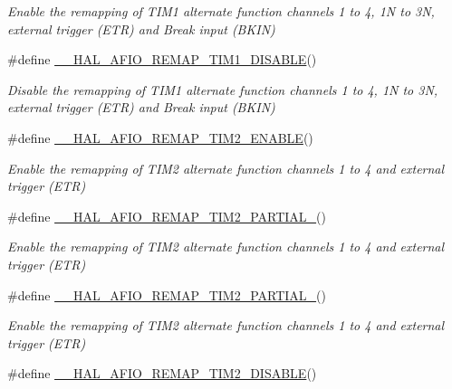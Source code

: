 \begin{DoxyCompactItemize}
\begin{DoxyCompactList}\small\item\em Enable the remapping of T\+I\+M1 alternate function channels 1 to 4, 1N to 3N, external trigger (E\+TR) and Break input (B\+K\+IN) \end{DoxyCompactList}\item 
\#define \hyperlink{group___g_p_i_o_ex___a_f_i_o___a_f___r_e_m_a_p_p_i_n_g_ga0d5d38cb3fbb600d76fdd4625e3d700c}{\+\_\+\+\_\+\+H\+A\+L\+\_\+\+A\+F\+I\+O\+\_\+\+R\+E\+M\+A\+P\+\_\+\+T\+I\+M1\+\_\+\+D\+I\+S\+A\+B\+LE}()
\begin{DoxyCompactList}\small\item\em Disable the remapping of T\+I\+M1 alternate function channels 1 to 4, 1N to 3N, external trigger (E\+TR) and Break input (B\+K\+IN) \end{DoxyCompactList}\item 
\#define \hyperlink{group___g_p_i_o_ex___a_f_i_o___a_f___r_e_m_a_p_p_i_n_g_gad5ea791926cf2e879de0fd08cb129775}{\+\_\+\+\_\+\+H\+A\+L\+\_\+\+A\+F\+I\+O\+\_\+\+R\+E\+M\+A\+P\+\_\+\+T\+I\+M2\+\_\+\+E\+N\+A\+B\+LE}()
\begin{DoxyCompactList}\small\item\em Enable the remapping of T\+I\+M2 alternate function channels 1 to 4 and external trigger (E\+TR) \end{DoxyCompactList}\item 
\#define \hyperlink{group___g_p_i_o_ex___a_f_i_o___a_f___r_e_m_a_p_p_i_n_g_gade6fd88cc370467cff853b404978190a}{\+\_\+\+\_\+\+H\+A\+L\+\_\+\+A\+F\+I\+O\+\_\+\+R\+E\+M\+A\+P\+\_\+\+T\+I\+M2\+\_\+\+P\+A\+R\+T\+I\+A\+L\+\_}()
\begin{DoxyCompactList}\small\item\em Enable the remapping of T\+I\+M2 alternate function channels 1 to 4 and external trigger (E\+TR) \end{DoxyCompactList}\item 
\#define \hyperlink{group___g_p_i_o_ex___a_f_i_o___a_f___r_e_m_a_p_p_i_n_g_ga3ffee1bceaa141be048b7f60c11c0943}{\+\_\+\+\_\+\+H\+A\+L\+\_\+\+A\+F\+I\+O\+\_\+\+R\+E\+M\+A\+P\+\_\+\+T\+I\+M2\+\_\+\+P\+A\+R\+T\+I\+A\+L\+\_}()
\begin{DoxyCompactList}\small\item\em Enable the remapping of T\+I\+M2 alternate function channels 1 to 4 and external trigger (E\+TR) \end{DoxyCompactList}\item 
\#define \hyperlink{group___g_p_i_o_ex___a_f_i_o___a_f___r_e_m_a_p_p_i_n_g_ga8bf8cf84fc099076c3ec6d7d31dd8abc}{\+\_\+\+\_\+\+H\+A\+L\+\_\+\+A\+F\+I\+O\+\_\+\+R\+E\+M\+A\+P\+\_\+\+T\+I\+M2\+\_\+\+D\+I\+S\+A\+B\+LE}()

\end{DoxyCompactItemize}
